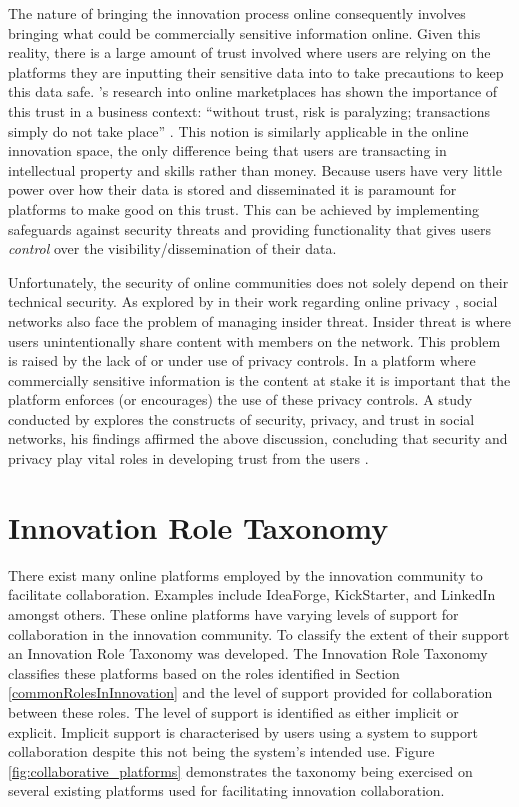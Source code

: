 The nature of bringing the innovation process online consequently involves bringing what could be commercially sensitive information online. Given this reality, there is a large amount of trust involved where users are relying on the platforms they are inputting their sensitive data into to take precautions to keep this data safe. \citeauthor{boyd2002community}'s research into online marketplaces has shown the importance of this trust in a business context: ``without trust, risk is paralyzing; transactions simply do not take place'' \cite{boyd2002community}. This notion is similarly applicable in the online innovation space, the only difference being that users are transacting in intellectual property and skills rather than money. Because users have very little power over how their data is stored and disseminated it is paramount for platforms to make good on this trust. This can be achieved by implementing safeguards against security threats and providing functionality that gives users {\em control} over the visibility/dissemination of their data.

Unfortunately, the security of online communities does not solely depend on their technical security. As explored by \citeauthor{johnson2012facebook} in their work regarding online privacy \cite{johnson2012facebook}, social networks also face the problem of managing insider threat. Insider threat is where users unintentionally share content with members on the network. This problem is raised by the lack of or under use of privacy controls. In a platform where commercially sensitive information is the content at stake it is important that the platform enforces (or encourages) the use of these privacy controls. A study conducted by \citeauthor{shin2010effects} explores the constructs of security, privacy, and trust in social networks, his findings affirmed the above discussion, concluding that security and privacy play vital roles in developing trust from the users \cite{shin2010effects}.

\section{Innovation Role Taxonomy}

There exist many online platforms employed by the innovation community to facilitate collaboration. Examples include IdeaForge, KickStarter, and LinkedIn amongst others. These online platforms have varying levels of support for collaboration in the innovation community. To classify the extent of their support an Innovation Role Taxonomy was developed. 
The Innovation Role Taxonomy classifies these platforms based on the roles identified in Section \ref{commonRolesInInnovation} and the level of support provided for collaboration between these roles. The level of support is identified as either implicit or explicit. Implicit support is characterised by users using a system to support collaboration despite this not being the system's intended use. Figure \ref{fig:collaborative_platforms} demonstrates the taxonomy being exercised on several existing platforms used for facilitating innovation collaboration.

